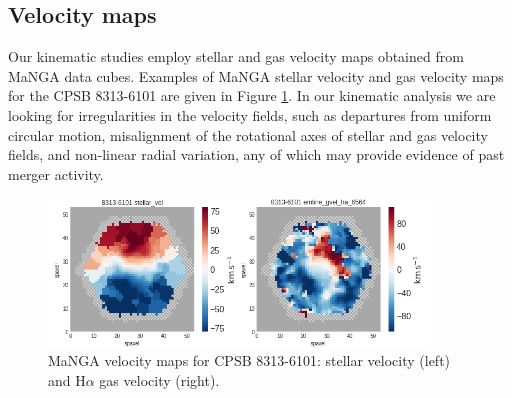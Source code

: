 \subsection{Velocity maps}
Our kinematic studies employ stellar and gas velocity maps obtained from MaNGA data  cubes. Examples of MaNGA stellar velocity and gas velocity maps for the CPSB 8313-6101 are given in Figure \ref{fig:CPSB-8313-6101-VMAPS}. In our kinematic analysis we are looking for irregularities in the velocity fields, such as departures from uniform circular motion, misalignment of the rotational axes of stellar and gas velocity fields,  and non-linear radial variation, any of which may provide evidence of past merger activity.

\begin{figure}
    \centering
    \includegraphics[width=0.9\textwidth]{images/VelocityMaps/CPSB-8313-6101-VMAPS.png}
    \caption[MaNGA velocity maps for CPSB 8313-6101]{MaNGA velocity maps for CPSB 8313-6101: stellar velocity (left) and H$\alpha$ gas velocity (right).}
    \label{fig:CPSB-8313-6101-VMAPS}
\end{figure}




